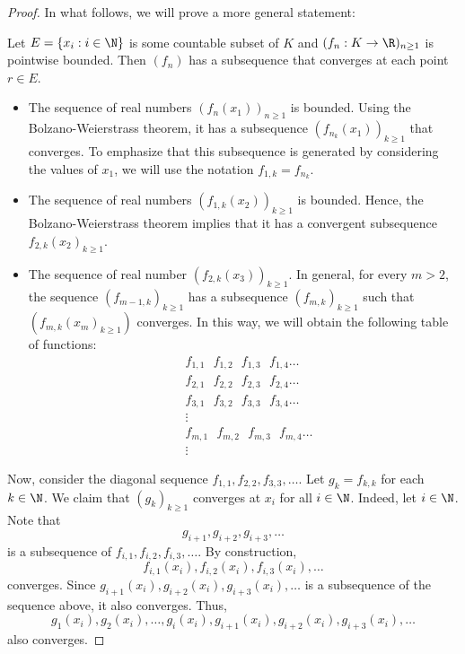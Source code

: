 \begin{proof}
In what follows, we will prove a more general statement:
\begin{center}
    Let \( E = \{ {x}_{i} : i \in \N  \}  \) is some countable subset of \( K  \) and \( ({f}_{n} : K \to \R )_{n \geq 1} \) is pointwise bounded. Then \( ({f}_{n}) \) has a subsequence that converges at each point \( r \in E  \). 
\end{center}
\begin{itemize}
    \item The sequence of real numbers \( ({f}_{n}({x}_{1}))_{n \geq 1} \) is bounded. Using the Bolzano-Weierstrass theorem, it has a subsequence \( ({f}_{{n}_{k }}({x}_{1}))_{k \geq 1} \) that converges. To emphasize that this subsequence is generated by considering the values of \( {x}_{1} \), we will use the notation \( {f}_{1,k} = {f}_{{n}_{k }} \). 
    \item The sequence of real numbers \( ({f}_{1,k}({x}_{2}))_{k \geq 1} \) is bounded. Hence, the Bolzano-Weierstrass theorem implies that it has a convergent subsequence \( {f}_{2,k}({x}_{2})_{k \geq 1} \). 
    \item The sequence of real number \( ({f}_{2,k}({x}_{3}))_{k \geq 1} \). In general, for every \( m > 2  \), the sequence \( ({f}_{m-1,k})_{k \geq 1} \) has a subsequence \( ({f}_{m,k })_{k \geq 1} \) such that \( ({f}_{m,k}({x}_{m})_{k \geq 1}) \) converges. In this way, we will obtain the following table of functions:
    \begin{align*}
        &{f}_{1,1}  \ \ \  {f}_{1,2} \ \ \   {f}_{1,3} \ \ \   {f}_{1,4} \dots  \\
        &{f}_{2,1} \  \ \   {f}_{2,2} \ \ \   {f}_{2,3} \ \ \  {f}_{2,4} \dots  \\
        &{f}_{3,1} \  \ \  {f}_{3,2} \ \ \   {f}_{3,3} \ \ \   {f}_{3,4} \dots  \\
        &\vdots \\
        &{f}_{m,1} \ \ \   {f}_{m,2} \ \ \   {f}_{m,3} \ \ \   {f}_{m,4} \dots  \\
        &\vdots
    \end{align*}
\end{itemize}
Now, consider the diagonal sequence \( {f}_{1,1} , {f}_{2,2}, {f}_{3,3}, \dots \). Let \( {g}_{k } = {f}_{k,k} \) for each \( k \in \N  \). We claim that \( ({g}_{k })_{k \geq 1} \) converges at \( {x}_{i} \) for all \( i \in \N  \). Indeed, let \( i \in \N  \). Note that 
\[  {g}_{i+1}, {g}_{i+2}, {g}_{i+3}, \dots  \]
is a subsequence of \( {f}_{i,1}, {f}_{i,2}, {f}_{i,3}, \dots \). By construction,  
\[  {f}_{i,1}({x}_{i}), {f}_{i,2}({x}_{i}), {f}_{i,3}({x}_{i}), \dots \]
converges. Since \( {g}_{i+1}({x}_{i}), {g}_{i+2}({x}_{i}), {g}_{i+3}({x}_{i}), \dots  \) is a subsequence of the sequence above, it also converges. Thus,   
\[  {g}_{1}({x}_{i}), {g}_{2}({x}_{i}), \dots, {g}_{i}({x}_{i}) , {g}_{i+1}({x}_{i}) , {g}_{i+2}({x}_{i}), {g}_{i+3}({x}_{i}) , \dots  \]
also converges.
\end{proof}


